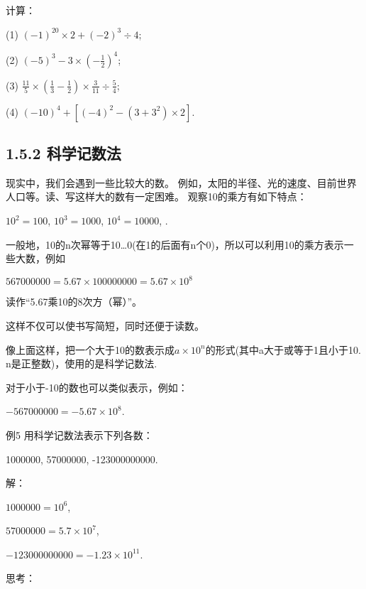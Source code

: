 \documentclass{article}
\begin{document}
\begin{example}
\begin{exercise}
    计算：

    (1) $(-1)^{20}\times2+(-2)^3\div4$;

    (2) $ (-5)^3-3\times(-\frac{1}{2})^4$;

    (3) $ \frac{11}{5}\times(\frac{1}{3}-\frac{1}{2})\times\frac{3}{11}\div\frac{5}{4}$;
    
    (4) $ (-10)^4+[(-4)^2-(3+3^2)\times2] $.
\end{exercise}

\subsection*{1.5.2 科学记数法}

现实中，我们会遇到一些比较大的数。 例如，太阳的半径、光的速度、目前世界人口等。读、写这样大的数有一定困难。
观察10的乘方有如下特点：

{$10^2=100$, $ 10^3=1000 $, $ 10^4=10000 $, \cdots.}

一般地，10的n次幂等于10\dots 0(在1的后面有n个0)，所以可以利用10的乘方表示一些大数，例如

$567000000=5.67\times100000000=5.67\times10^{8}$

读作“5.67乘10的8次方（幂）”。

这样不仅可以使书写简短，同时还便于读数。

\begin{definition}

像上面这样，把一个大于10的数表示成$a\times10^{n}$的形式(其中a大于或等于1且小于10. n是正整数)，使用的是科学记数法.

\end{definition}   

对于小于-10的数也可以类似表示，例如：

$ -567000000=-5.67\times10^{8} $.

\begin{example}

例5 用科学记数法表示下列各数：

1000000, 57000000, -123000000000.

解：

$1000000=10^{6}$,

$ 57000000=5.7\times10^{7} $,

$ -123000000000=-1.23\times10^{11} $.

\end{example}

\begin{exercise}
思考：


\end{exercise}
\end{example}
\end{document}
